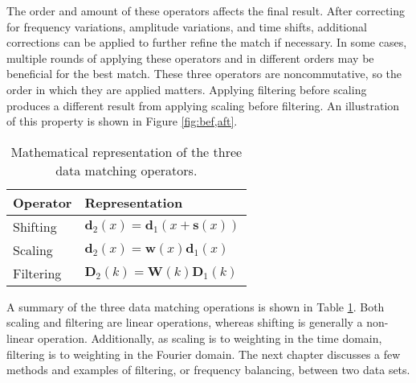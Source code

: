 The order and amount of these operators affects the final result.
After correcting for frequency variations, amplitude variations, and time shifts, additional corrections can be applied to further refine the match if necessary.
In some cases, multiple rounds of applying these operators and in different orders may be beneficial for the best match.
These three operators are noncommutative, so the order in which they are applied matters.
Applying filtering before scaling produces a different result from applying scaling before filtering. 
An illustration of this property is shown in Figure \ref{fig:bef,aft}.


\begin{table}[h]
\centering
\begin{tabular}{l|l}
\textbf{Operator} & \textbf{Representation} \\ \hline
        Shifting          & $\mathbf{d}_2(x) = \mathbf{d}_1(x + \mathbf{s}(x))$\\
        Scaling           & $\mathbf{d}_2(x) = \mathbf{w}(x)\mathbf{d}_1(x)$\\
        Filtering         & $\mathbf{D}_2(k) = \mathbf{W}(k)\mathbf{D}_1(k)$
\end{tabular}
\caption{Mathematical representation of the three data matching operators.}
\label{op}
\end{table}

A summary of the three data matching operations is shown in Table \ref{op}.
Both scaling and filtering are linear operations, whereas shifting is generally a non-linear operation.
Additionally, as scaling is to weighting in the time domain, filtering is to weighting in the Fourier domain.
The next chapter discusses a few methods and examples of filtering, or frequency balancing, between two data sets.
